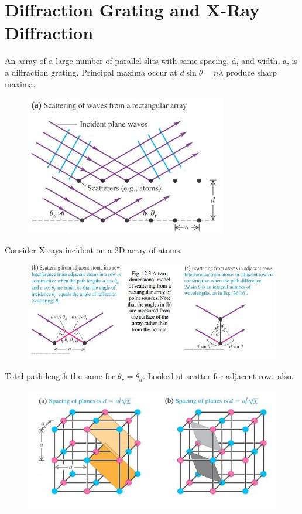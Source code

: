\documentclass[a4paper, 11pt, normalem]{report}
\begin{document}
\section{Diffraction Grating and X-Ray Diffraction}
An array of a large number of parallel slits with same spacing, d, and width, a, is a diffraction grating.
Principal maxima occur at $d\sin{\theta} = n\lambda$ produce sharp maxima.
\begin{figure}[H]
    \centering
    \includegraphics{Grat1.jpg}
\end{figure}
Consider X-rays incident on a 2D array of atoms.
\begin{figure}[H]
    \centering
    \includegraphics[width=\textwidth]{Scatter.jpg}
\end{figure}
Total path length the same for $\theta_{r} = \theta_{a}$.
Looked at scatter for adjacent rows also.
\begin{figure}[H]
    \centering
    \includegraphics{Crystals.jpg}
\end{figure}
\end{document}
